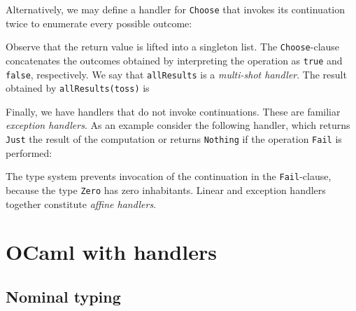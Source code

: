 \documentclass[mscres,cdtppar,twoside,openright,logo,rightchapter,normalheadings]{infthesis}
\theoremstyle{definition}
\begin{document}
Alternatively, we may define a handler for \lstinline$Choose$ that
invokes its continuation twice to enumerate every possible outcome:
%

%
Observe that the return value is lifted into a singleton list. The
\lstinline$Choose$-clause concatenates the outcomes obtained by
interpreting the operation as \lstinline$true$ and \lstinline$false$,
respectively. We say that \lstinline$allResults$ is a \emph{multi-shot
  handler}. The result obtained by \lstinline$allResults(toss)$ is
%

%

Finally, we have handlers that do not invoke continuations. These are
familiar \emph{exception handlers}. As an example consider the
following handler, which returns \lstinline$Just$ the result of the
computation or returns \lstinline$Nothing$ if the operation
\lstinline$Fail$ is performed:
%

%
The type system prevents invocation of the continuation in the
\lstinline$Fail$-clause, because the type \lstinline$Zero$ has zero
inhabitants. Linear and exception handlers together constitute
\emph{affine handlers}.

\section{OCaml with handlers}
\label{sec:ocaml-handlers}

\subsection{Nominal typing}


\end{document}
